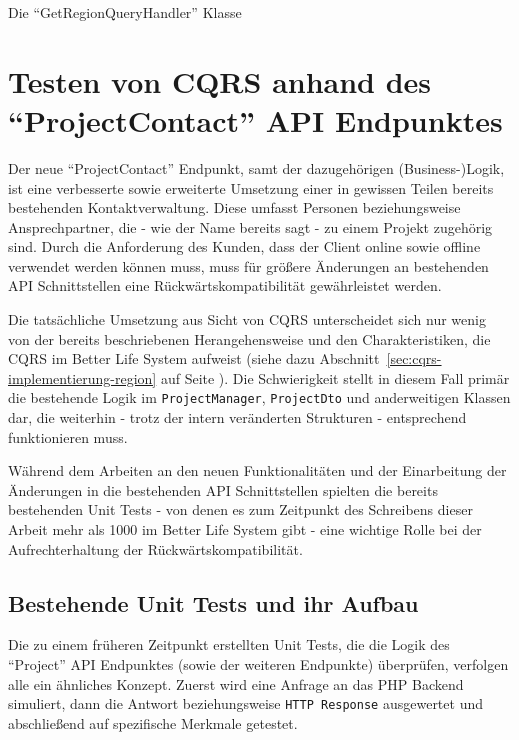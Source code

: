 \documentclass[a4paper,12pt,twoside]{scrreprt}
\begin{document}
\begin{listing}[ht]
    \inputminted[fontsize=\footnotesize,linenos,breaklines]{php}{code/get_region_queryhandler.php}
    \caption[Die \enquote{GetRegionQueryHandler} Klasse]{Die \enquote{GetRegionQueryHandler} Klasse}
    \label{code:get-region-queryhandler}
\end{listing}

\section{Testen von CQRS anhand des \enquote{ProjectContact} API Endpunktes}
\label{sec:cqrs-implementierung-project-contact}
Der neue \enquote{ProjectContact} Endpunkt, samt der dazugehörigen (Business-)Logik, ist eine verbesserte sowie erweiterte Umsetzung einer in gewissen Teilen bereits bestehenden Kontaktverwaltung. Diese umfasst Personen beziehungsweise Ansprechpartner, die - wie der Name bereits sagt - zu einem Projekt zugehörig sind. Durch die Anforderung des Kunden, dass der Client online sowie offline verwendet werden können muss, muss für größere Änderungen an bestehenden API Schnittstellen eine Rückwärtskompatibilität gewährleistet werden.

\medskip

Die tatsächliche Umsetzung aus Sicht von CQRS unterscheidet sich nur wenig von der bereits beschriebenen Herangehensweise und den Charakteristiken, die CQRS im Better Life System aufweist (siehe dazu Abschnitt~\ref{sec:cqrs-implementierung-region} auf Seite \pageref{sec:cqrs-implementierung-region}). Die Schwierigkeit stellt in diesem Fall primär die bestehende Logik im \texttt{ProjectManager}, \texttt{ProjectDto} und anderweitigen Klassen dar, die weiterhin - trotz der intern veränderten Strukturen - entsprechend funktionieren muss.

\medskip

Während dem Arbeiten an den neuen Funktionalitäten und der Einarbeitung der Änderungen in die bestehenden API Schnittstellen spielten die bereits bestehenden Unit Tests - von denen es zum Zeitpunkt des Schreibens dieser Arbeit mehr als 1000 im Better Life System gibt - eine wichtige Rolle bei der Aufrechterhaltung der Rückwärtskompatibilität.

\subsection{Bestehende Unit Tests und ihr Aufbau}
\label{sub-sec:v1-unit-tests}
Die zu einem früheren Zeitpunkt erstellten Unit Tests, die die Logik des \enquote{Project} API Endpunktes (sowie der weiteren Endpunkte) überprüfen, verfolgen alle ein ähnliches Konzept. Zuerst wird eine Anfrage an das PHP Backend simuliert, dann die Antwort beziehungsweise \texttt{HTTP Response} ausgewertet und abschließend auf spezifische Merkmale getestet.
\end{document}
